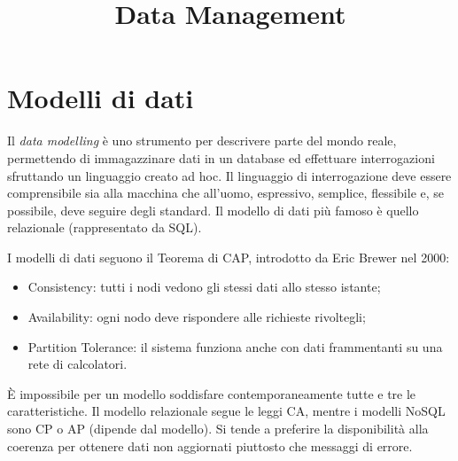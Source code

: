 \documentclass[a4page, 11pt]{article}
\title{Data Management}
\author{}
\date{}
\begin{document}
\maketitle


\part{Modelli di dati}
Il \textit{data modelling} è uno strumento per descrivere parte del mondo reale, permettendo di immagazzinare dati in un database ed effettuare interrogazioni sfruttando un linguaggio creato ad hoc.
Il linguaggio di interrogazione deve essere comprensibile sia alla macchina che all'uomo, espressivo, semplice, flessibile e, se possibile, deve seguire degli standard.
Il modello di dati più famoso è quello relazionale (rappresentato da SQL).

I modelli di dati seguono il Teorema di CAP, introdotto da Eric Brewer nel 2000:
\begin{itemize}
\item Consistency: tutti i nodi vedono gli stessi dati allo stesso istante;
\item Availability: ogni nodo deve rispondere alle richieste rivoltegli;
\item Partition Tolerance: il sistema funziona anche con dati frammentanti su una rete di calcolatori.
\end{itemize}
È impossibile per un modello soddisfare contemporaneamente tutte e tre le caratteristiche\cite{NoSQLDB}.
Il modello relazionale segue le leggi CA, mentre i modelli NoSQL sono CP o AP (dipende dal modello).
Si tende a preferire la disponibilità alla coerenza per ottenere dati non aggiornati piuttosto che messaggi di errore.
\end{document}
